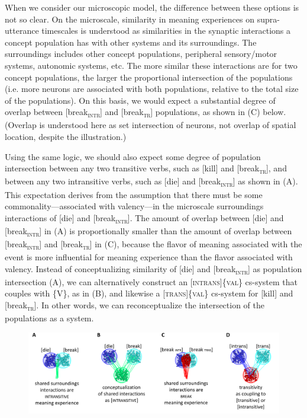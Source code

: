   When we consider our microscopic model, the difference between these options is not so clear. On the microscale, similarity in meaning experiences on supra-utterance timescales is understood as similarities in the synaptic interactions a concept population has with other systems and its surroundings. The surroundings includes other concept populations, peripheral sensory/motor systems, autonomic systems, etc. The more similar these interactions are for two concept populations, the larger the proportional intersection of the populations (i.e. more neurons are associated with both populations, relative to the total size of the populations). On this basis, we would expect a substantial degree of overlap between [break\textsc{\textsubscript{intr}}] and [break\textsc{\textsubscript{tr}}] populations, as shown in (C) below. (Overlap is understood here as set intersection of neurons, not overlap of spatial location, despite the illustration.)

  Using the same logic, we should also expect some degree of population intersection between any two transitive verbs, such as [kill] and [break\textsc{\textsubscript{tr}}], and between any two intransitive verbs, such as [die] and [break\textsc{\textsubscript{intr}}] as shown in (A). This expectation derives from the assumption that there must be some commonality—associated with valency—in the microscale surroundings interactions of [die] and [break\textsc{\textsubscript{intr}}]. The amount of overlap between [die] and [break\textsc{\textsubscript{intr}}] in (A) is proportionally smaller than the amount of overlap between [break\textsc{\textsubscript{intr}}] and [break\textsc{\textsubscript{tr}}] in (C), because the flavor of meaning associated with the event is more influential for meaning experience than the flavor associated with valency. Instead of conceptualizing similarity of [die] and [break\textsc{\textsubscript{intr}}] as population intersection (A), we can alternatively construct an [\textsc{intrans}]\{\textsc{val}\} cs-system that couples with \{V\}, as in (B), and likewise a [\textsc{trans}]\{\textsc{val}\} cs-system for [kill] and [break\textsc{\textsubscript{tr}}]. In other words, we can reconceptualize the intersection of the populations as a system.

  
\begin{figure}
\includegraphics[width=\textwidth]{figures/Tilsen-img73.png}
\caption{\missingcaption}
\label{fig:}
\end{figure}
 

